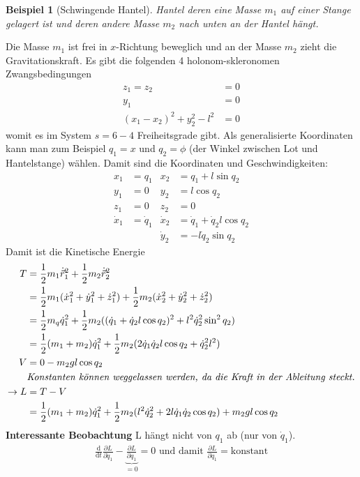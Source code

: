 \documentclass[oneside]{book}
\theoremstyle{definition}
\newtheorem*{beispiel*}{Beispiel}
\renewcommand{\d}{\mathrm d}
\newcommand{\dd}[1]{\frac{\d}{\d #1}}
\newcommand{\ffpartial}[2]{\frac{\partial #1}{\partial #2}}
\newcommand{\vecdotnumsq}[2]{\dot{\vec{#1}}^2_#2}
\begin{document}
\begin{beispiel*}[Schwingende Hantel]
	\textit{Hantel deren eine Masse $m_1$ auf einer Stange gelagert ist und deren andere Masse $m_2$ nach unten an der Hantel hängt.}
	
	Die Masse $m_1$ ist frei in $x$-Richtung beweglich und an der Masse $m_2$ zieht die Gravitationskraft.
	Es gibt die folgenden 4 holonom-skleronomen Zwangsbedingungen
	\begin{align*}
	z_1 = z_2 &= 0\\
	y_1 &= 0\\
	(x_1 - x_2)^2 + y_2^2 - l^2 &= 0
	\end{align*}
	womit es im System $s = 6 -4$ Freiheitsgrade gibt.
	Als generalisierte Koordinaten kann man zum Beispiel $q_1 = x$ und $q_2 = \phi$ (der Winkel zwischen Lot und Hantelstange) wählen. Damit sind die Koordinaten und Geschwindigkeiten:
	\begin{align*}
	x_1 &= q_1 & x_2 &= q_1 + l \sin q_2\\
	y_1 &= 0 & y_2 &= l \cos q_2\\
	z_1 &= 0 & z_2 &= 0\\
	\dot{x}_1 &= \dot{q}_1 & \dot{x}_2 &= \dot{q}_1 + \dot{q}_2 l \cos q_2\\
	&&\dot{y}_2 &= - l \dot{q}_2 \sin q_2
	\end{align*}
	Damit ist die Kinetische Energie
	\begin{align*}
	T & = \frac12 m_1 \vecdotnumsq{r}{1} + \frac12 m_2 \vecdotnumsq{r}{2}\\
	&= \frac12 m_1 (\dot{x}_1^2 + \dot{y}_1^2 + \dot{z}_1^2) + \frac12 m_2 (\dot{x}_2^2 + \dot{y}_2^2 + \dot{z}_2^2)\\
	&= \frac12 m_q \dot{q}_1^2 + \frac12 m_2 ( (\dot{q}_1 + \dot{q}_2 l \cos q_2)^2 + l^2 \dot{q}_2^2 \sin^2 q_2)\\
	&= \frac12 (m_1 + m_2) \dot{q}_1^2 + \frac12 m_2 (2 \dot{q}_1 \dot{q}_2 l \cos q_2 + \dot{q}_2^2 l^2)\\
	V &= 0 - m_2 g l \cos q_2\\
	&\text{\textit{Konstanten können weggelassen werden, da die Kraft in der Ableitung steckt.}}\\
	\rightarrow L &= T - V\\
	&= \frac12 (m_1 + m_2) \dot{q}_1^2 + \frac12 m_2 (l^2 \dot{q}_2^2 + 2 l \dot{q}_1 \dot{q}_2 \cos q_2) + m_2 g l \cos q_2
	\end{align*}
	\textbf{Interessante Beobachtung} L hängt nicht von $q_1$ ab (nur von $\dot{q}_1$).
	\begin{align*}
	\dd t \ffpartial{L}{\dot{q}_1} - \underbrace{\ffpartial{L}{q_1}}_{= 0} = 0 \text{~und damit~} 	\ffpartial{L}{\dot{q}_1} = \text{konstant}
	\end{align*}
\end{beispiel*}
\end{document}
